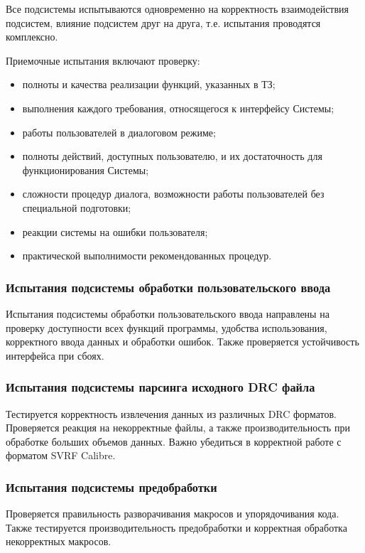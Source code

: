 Все подсистемы испытываются одновременно
на корректность взаимодействия подсистем,
влияние подсистем друг на друга, т.е. испытания проводятся комплексно.

Приемочные испытания включают проверку:

\begin{itemize}
	\item полноты и качества реализации функций, указанных в ТЗ;
	\item выполнения каждого требования, относящегося к интерфейсу Системы;
	\item работы пользователей в диалоговом режиме;
	\item полноты действий, доступных пользователю,
		и их достаточность для функционирования Системы;
	\item сложности процедур диалога,
		возможности работы пользователей без специальной подготовки;
	\item реакции системы на ошибки пользователя;
	\item практической выполнимости рекомендованных процедур.
\end{itemize}

\subsubsection{Испытания подсистемы обработки пользовательского ввода}

Испытания подсистемы обработки пользовательского ввода
направлены на проверку доступности всех функций программы,
удобства использования, корректного ввода данных и обработки ошибок.
Также проверяется устойчивость интерфейса при сбоях.

\subsubsection{Испытания подсистемы парсинга исходного DRC файла}

Тестируется корректность извлечения данных из различных DRC форматов.
Проверяется реакция на некорректные файлы,
а также производительность при обработке больших объемов данных.
Важно убедиться в корректной работе с форматом SVRF Calibre.

\subsubsection{Испытания подсистемы предобработки}

Проверяется правильность разворачивания макросов и упорядочивания кода.
Также тестируется производительность предобработки
и корректная обработка некорректных макросов.


